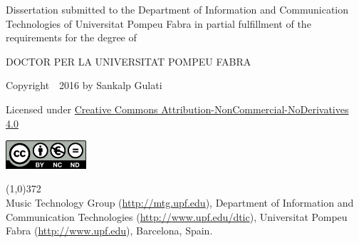 \cleartorecto
\thispagestyle{empty}

\vspace*{02cm}

Dissertation submitted to the Department of Information and Communication Technologies of Universitat Pompeu Fabra in partial fulfillment of the requirements for the degree of

\vspace*{0.5cm}

\centerline{DOCTOR PER LA UNIVERSITAT POMPEU FABRA}


\vspace*{4cm}


{\centering

	Copyright~\textcopyright~2016 by Sankalp Gulati

	Licensed under \href{http://creativecommons.org/licenses/by-nc-nd/4.0/}{Creative Commons Attribution-NonCommercial-NoDerivatives 4.0}

	\vspace{0.5cm}

	\href{http://creativecommons.org/licenses/by-nc-nd/4.0/}
	{
		\centering
		\includegraphics[width=3cm]{ch00/figures/creative-commons.png}
		}

}

\vspace*{\fill}

\line(1,0){372}\\
\footnotesize
Music Technology Group (\url{http://mtg.upf.edu}), Department of Information and Communication Technologies (\url{http://www.upf.edu/dtic}), Universitat Pompeu Fabra (\url{http://www.upf.edu}), Barcelona, Spain.
\normalsize



